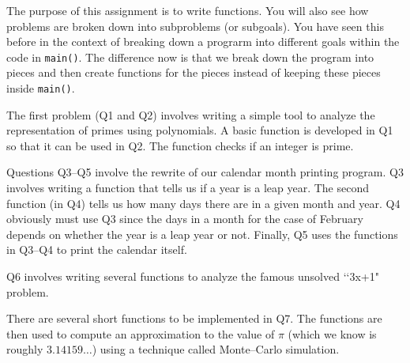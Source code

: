 
The purpose of this assignment is to write functions. You will also see how
problems are broken down into subproblems (or subgoals). You have seen this
before in the context of breaking down a prograrm into different goals within
the code in \verb!main()!. The difference now is that we break down the
program into pieces and then create functions for the pieces instead of
keeping these pieces inside \verb!main()!.

The first problem (Q1 and Q2) involves writing a simple tool to analyze
the representation of primes using polynomials. A basic function is developed
in Q1 so that it can be used in Q2. The function checks if an integer is
prime.

Questions Q3--Q5 involve the rewrite of our calendar month printing
program. Q3 involves writing a function that tells us if a year is a leap
year. The second function (in Q4) tells us how many days there are in a
given month and year. Q4 obviously must use Q3 since the days in a month
for the case of February depends on whether the year is a leap year or not.
Finally, Q5 uses the functions in Q3--Q4 to print the calendar itself.

Q6 involves writing several functions to analyze the famous unsolved
\lq\lq3x+1" problem.

There are several short functions to be implemented in Q7. The functions are
then used to compute an approximation to the value of $\pi$ (which we know is
roughly $3.14159\ldots$) using a technique called Monte--Carlo simulation.
